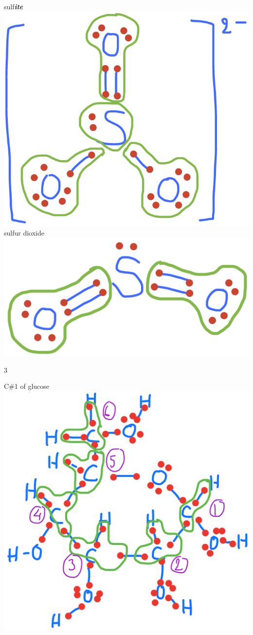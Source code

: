 \documentclass[]{book}
\theoremstyle{definition}
\theoremstyle{definition}
\theoremstyle{definition}
\theoremstyle{remark}
\begin{document}
sulf\emph{\textbf{ite}}~\includegraphics{pictures/ElecAlloc_SO32-.png}
sulfur dioxide ~\includegraphics{pictures/ElecAlloc_SO2.png}

3

C\#1 of glucose~\includegraphics{pictures/ElecAlloc_glucose.png}
\end{document}
